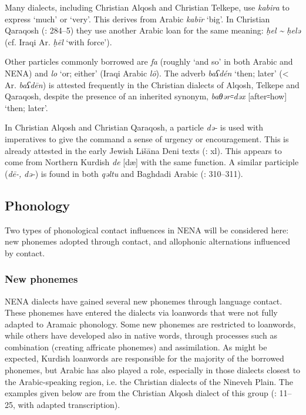 \documentclass[output=paper]{langsci/langscibook}
\begin{document}
Many dialects, including Christian Alqosh and Christian Telkepe, use \textit{kabira} to express ‘much’ or ‘very’. This derives from Arabic \textit{kabīr} ‘big’. In Christian Qaraqosh (\citealt{Khan2002}: 284–5) they use another Arabic loan for the same meaning: \textit{ḥel {\textasciitilde} ḥelə} (cf. Iraqi Ar. \textit{ḥēl} ‘with force’).

Other particles commonly borrowed are \textit{fa} (roughly ‘and so’ in both Arabic and NENA) and \textit{lo} ‘or; either’ (Iraqi Arabic \textit{lō}). The adverb \textit{baʕdén} ‘then; later’ (< Ar. \textit{baʕdēn}) is attested frequently in the Christian dialects of Alqosh, Telkepe and Qaraqosh, despite the presence of an inherited synonym, \textit{baθər꞊dəx} [after꞊how] ‘then; later’.

In Christian Alqosh and Christian Qaraqosh, a particle \textit{də\nobreakdash-} is used with imperatives to give the command a sense of urgency or encouragement. This is already attested in the early Jewish Lišāna Deni texts (\citealt{Sabar1976}: xl). This appears to come from Northern Kurdish \textit{de} [dæ] with the same function. A similar participle (\textit{dē\nobreakdash-,} \textit{də\nobreakdash-}) is found in both \textit{qəltu} and Baghdadi Arabic (\citealt{Jastrow1978}: 310–311).

\subsection{Phonology}

Two types of phonological contact influences in NENA will be considered here: new phonemes adopted through contact, and allophonic alternations influenced by contact.

\subsubsection{New phonemes}

NENA dialects have gained several new phonemes through language contact. These phonemes have entered the dialects via loanwords that were not fully adapted to Aramaic phonology. Some new phonemes are restricted to loanwords, while others have developed also in native words, through processes such as combination (creating affricate phonemes) and assimilation. As might be expected, Kurdish loanwords are responsible for the majority of the borrowed phonemes, but Arabic has also played a role, especially in those dialects closest to the Arabic-speaking region, i.e. the Christian dialects of the Nineveh Plain. The examples given below are from the Christian Alqosh dialect of this group (\citealt{Coghill2004}: 11–25, with adapted transcription).
\end{document}
